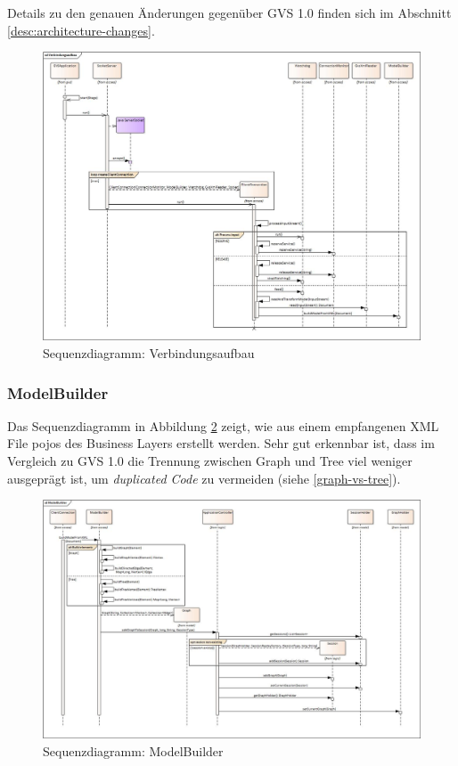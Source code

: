 \documentclass[11pt,a4paper,english,oneside]{book}
\numberwithin{equation}{chapter}
\begin{document}
	\noindent
	Details zu den genauen Änderungen gegenüber GVS 1.0 finden sich im Abschnitt \ref{desc:architecture-changes}.

	\begin{figure}[h!]
		\centering
		\includegraphics[width=\linewidth]{assets/images/sequence_Verbindungsaufbau}
		\caption{Sequenzdiagramm: Verbindungsaufbau}
		\label{fig:sd-verbindungsaufbau-2}
	\end{figure}

	\clearpage
	
	\subsubsection{ModelBuilder}
	Das Sequenzdiagramm in Abbildung \ref{fig:sd-modelbuilder-2} zeigt, wie aus einem empfangenen XML File \glspl{pojo} des Business Layers erstellt werden. Sehr gut erkennbar ist, dass im Vergleich zu GVS 1.0 die Trennung zwischen Graph und Tree viel weniger ausgeprägt ist, um \textit{duplicated Code} zu vermeiden (siehe \ref{graph-vs-tree}).
	\begin{figure}[h!]
		\centering
		\includegraphics[width=\linewidth]{assets/images/sequence_ModelBuilder}
		\caption{Sequenzdiagramm: ModelBuilder}
		\label{fig:sd-modelbuilder-2}
	\end{figure}	
\end{document}
